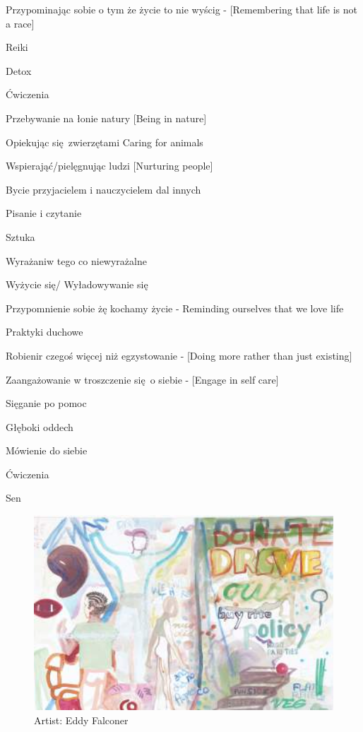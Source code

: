 \begin{multicols}{2}
\begin{checkboxlist}
\item Przypominając sobie o tym że życie to nie wyścig - [Remembering that life is not a race]
\item Reiki
\item Detox
\item Ćwiczenia
\item Przebywanie na łonie natury [Being in nature]
\item Opiekując się zwierzętami Caring for animals
\item Wspierająć/pielęgnując ludzi [Nurturing people]
\item Bycie przyjacielem i nauczycielem dal innych
\item Pisanie i czytanie
\item Sztuka
\item Wyrażaniw tego co niewyrażalne
\item Wyżycie się/ Wyładowywanie się
\item Przypomnienie sobie żę kochamy życie - Reminding ourselves that we love life
\item Praktyki duchowe
\item Robienir czegoś więcej niż egzystowanie - [Doing more rather than just existing]
\item Zaangażowanie w troszczenie się o siebie - [Engage in self care]
\item Sięganie po pomoc
\item Głęboki oddech
\item Mówienie do siebie
\item Ćwiczenia
\item Sen
\end{checkboxlist}
\end{multicols}

\newpage
\begin{figure}[h]
\centering
\includegraphics[width=16cm]{TeX_files/3-2.png}
\caption{Artist: Eddy Falconer}
\label{3-2}
\end{figure}

